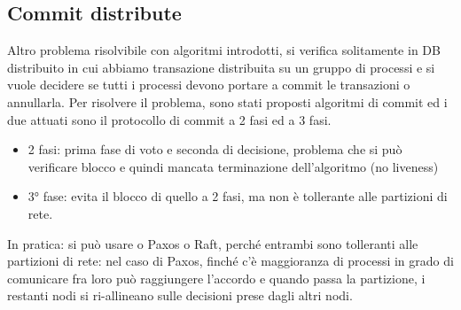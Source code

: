 \documentclass{article}
\begin{document}
\subsection{Commit distribute}
Altro problema risolvibile con algoritmi introdotti, si verifica solitamente in DB distribuito in cui abbiamo transazione distribuita su un gruppo di processi e si vuole decidere se tutti i processi devono portare a commit le transazioni o annullarla. Per risolvere il problema, sono stati proposti algoritmi di commit ed i due attuati sono il protocollo di commit a 2 fasi ed a 3 fasi.
\begin{itemize}
\item 2 fasi: prima fase di voto e seconda di decisione, problema che si può verificare blocco e quindi mancata terminazione dell'algoritmo (no liveness)
\item 3° fase: evita il blocco di quello a 2 fasi, ma non è tollerante alle partizioni di rete.
\end{itemize}
In pratica: si può usare o Paxos o Raft, perché entrambi sono tolleranti alle partizioni di rete: nel caso di Paxos, finché c'è maggioranza di processi in grado di comunicare fra loro può raggiungere l'accordo e quando passa la partizione, i restanti nodi si ri-allineano sulle decisioni prese dagli altri nodi.
\end{document}
